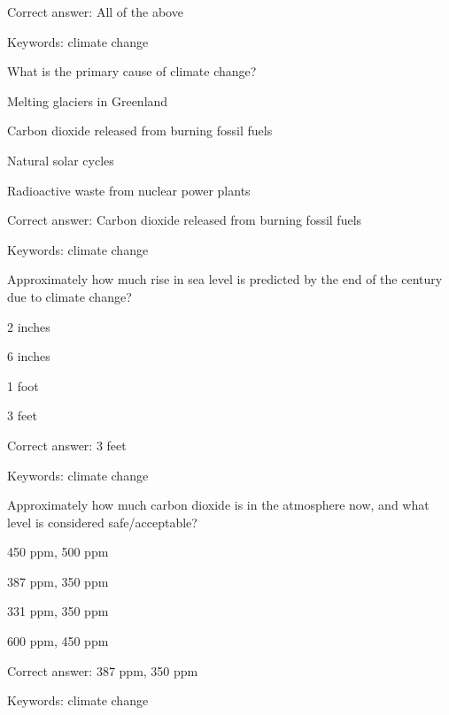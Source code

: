 Correct answer: All of the above

Keywords: climate change

\begin{question}
	\item What is the primary cause of climate change?
\end{question}

\begin{answer}
	\item Melting glaciers in Greenland
	\item Carbon dioxide released from burning fossil fuels
	\item Natural solar cycles
	\item Radioactive waste from nuclear power plants
\end{answer}

Correct answer: Carbon dioxide released from burning fossil fuels

Keywords: climate change

\begin{question}
	\item Approximately how much rise in sea level is predicted by the end of the century due to climate change?
\end{question}

\begin{answer}
	\item 2 inches
	\item 6 inches
	\item 1 foot
	\item 3 feet
\end{answer}

Correct answer: 3 feet

Keywords: climate change

\begin{question}
	\item Approximately how much carbon dioxide is in the atmosphere now, and what level is considered safe/acceptable?
\end{question}

\begin{answer}
	\item 450 ppm, 500 ppm
	\item 387 ppm, 350 ppm
	\item 331 ppm, 350 ppm
	\item 600 ppm, 450 ppm
\end{answer}

Correct answer: 387 ppm, 350 ppm

Keywords: climate change

